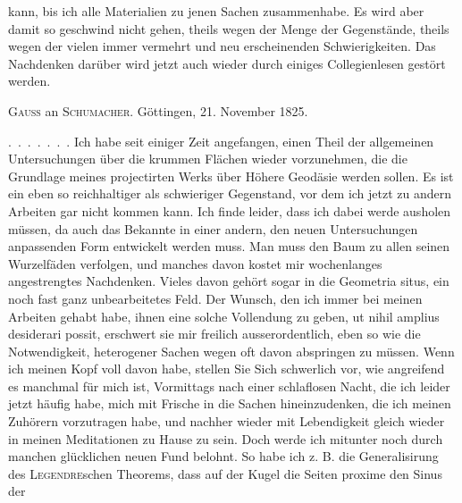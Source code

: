 %
kann, bis ich alle Materialien zu jenen Sachen zusammenhabe. Es wird aber damit so geschwind nicht gehen, theils wegen der Menge der Gegenstände, theils wegen der vielen immer vermehrt und neu erscheinenden Schwierigkeiten. Das Nachdenken darüber wird jetzt auch wieder durch einiges Collegienlesen gestört werden.
\par{}
\begin{center}\textsc{Gauss} an \textsc{Schumacher}. Göttingen, 21. November 1825.\end{center}
\indent\mbox{. . . . . . .} Ich habe seit einiger Zeit angefangen, einen Theil der allgemeinen Untersuchungen über die krummen Flächen wieder vorzunehmen, die die Grundlage meines projectirten Werks über Höhere Geodäsie werden sollen. Es ist ein eben so reichhaltiger als schwieriger Gegenstand, vor dem ich jetzt zu andern Arbeiten gar nicht kommen kann. Ich finde leider, dass ich dabei  werde ausholen müssen, da auch das Bekannte in einer andern, den neuen Untersuchungen anpassenden Form entwickelt werden muss. Man muss den Baum zu allen seinen Wurzelfäden verfolgen, und manches davon kostet mir wochenlanges angestrengtes Nachdenken. Vieles davon gehört sogar in die Geometria situs, ein noch fast ganz unbearbeitetes Feld. Der Wunsch, den ich immer bei meinen Arbeiten gehabt habe, ihnen eine solche Vollendung zu geben, ut nihil amplius desiderari possit, erschwert sie mir freilich ausserordentlich, eben so wie die Notwendigkeit, heterogener Sachen wegen oft davon abspringen zu müssen. Wenn ich meinen Kopf voll davon habe, stellen Sie Sich schwerlich vor, wie angreifend es manchmal für mich ist, Vormittags nach einer schlaflosen Nacht, die ich leider jetzt häufig habe, mich mit Frische in die Sachen hineinzudenken, die ich meinen Zuhörern vorzutragen habe, und nachher wieder mit Lebendigkeit gleich wieder in meinen Meditationen zu Hause zu sein. Doch werde ich mitunter noch durch manchen glücklichen neuen Fund belohnt. So habe ich z. B. die Generalisirung des \textsc{Legendre}schen Theorems, dass auf der Kugel die Seiten proxime den Sinus der
